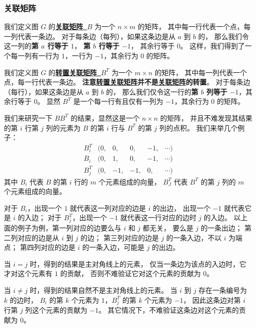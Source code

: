 \documentclass[UTF8]{article}
\begin{document}
	\subsubsection{关联矩阵}

	我们定义图 $G$ 的\textbf{\uline{关联矩阵~$B$}} 为一个 $n \times m$ 的矩阵，
	其中每一行代表一个点，每一列代表一条边。
	对于每条边（每列），如果这条边是从 $a$ 到 $b$ 的，
	那么我们令这一列的\textbf{第 $a$ 行等于 $1$}，
	\textbf{第 $b$ 行等于 $-1$}，
	其余行等于 $0$。
	这样，我们得到了一个每一列有一行为 $1$，一行为 $-1$，其余行为 $0$ 的矩阵。
	
	我们定义图 $G$ 的\textbf{\uline{转置关联矩阵~$B^T$}} 为一个 $m \times n$ 的矩阵，
	其中每一列代表一个点，每一行代表一条边。
	\textbf{注意\uline{转置关联矩阵}并不是\uline{关联矩阵}的转置}。
	对于每条边（每行），如果这条边是从 $a$ 到 $b$ 的，
	那么我们仅令这一行的\textbf{第 $b$ 列等于 $-1$}，其余行等于 $0$。
	显然 $B^T$ 是一个每一行有且仅有一列为 $-1$，其余行为 $0$ 的矩阵。

	我们来研究一下 $B B^T$ 的结果，显然这是一个 $n \times n$ 的矩阵，
	并且不难发现其结果的第 $i$ 行第 $j$ 列的元素为
	$B$ 的第 $i$ 行与 $B^T$ 的第 $j$ 列的点积。
	我们来举几个例子：
	\begin{equation*}
		\begin{matrix}
			B^T_i& (0,& 0,& 0,& -1,& \cdots)
			\\
			B_i& (0,& 1,& 0,& -1,& \cdots)
			\\
			B^T_j& (0,& -1,& -1,& 0,& \cdots)
		\end{matrix}
	\end{equation*}
	其中 $B_i$ 代表 $B$ 的第 $i$ 行的 $m$ 个元素组成的向量，
	$B^T_J$ 代表 $B^T$ 的第 $j$ 列的 $m$ 个元素组成的向量。

	对于 $B_i$，出现一个 $1$ 就代表这一列对应的边是 $i$ 的出边，
	出现一个 $-1$ 就代表它是 $i$ 的入边；
	对于 $B^T_j$，出现一个 $-1$ 就代表这一行对应的边时 $j$ 的入边。
	以上面的例子为例，第一列对应的边要么与 $i$ 和 $j$ 都无关，
	要么是 $j$ 的一条出边；
	第二列对应的边是从 $i$ 到 $j$ 的边；
	第三列对应的边是 $j$ 的一条入边，不以 $i$ 为端点；
	第四列对应的边是 $i$ 的一条入边，可能是 $j$ 的出边。

	当 $i = j$ 时，得到的结果是主对角线上的元素，
	仅当一条边为该点的入边时，它才对这个元素有 $1$ 的贡献，
	否则不难验证它对这个元素的贡献为 $0$。

	当 $i \ne j$ 时，得到的结果自然不是主对角线上的元素。
	当 $i$ 到 $j$ 存在一条编号为 $k$ 的边时，
	$B_i$ 的第 $k$ 个元素为 $1$，$B^T_j$ 的第 $k$ 个元素为 $-1$，
	因此这条边对第 $i$ 行第 $j$ 列这个元素的贡献为 $-1$。
	其它情况下，不难验证这条边对这个元素的贡献为 $0$。
\end{document}
